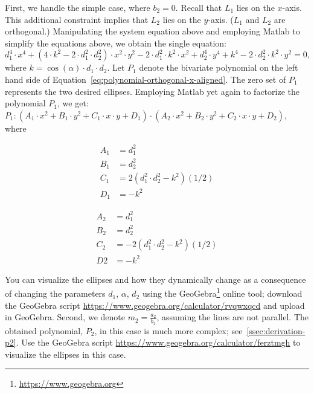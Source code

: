 First, we handle the simple case, where $b_2 = 0$. Recall that $L_1$ lies on the $x$-axis. This additional constraint implies that $L_2$ lies on the $y$-axis. ($L_1$ and $L_2$ are orthogonal.) Manipulating the system equation above and employing Matlab to simplify the equations above, we obtain the single equation:
\begin{equation}
  d_1^4\cdot x^4 + (4\cdot k^2 - 2\cdot d_1^2\cdot d_2^2)\cdot x^2\cdot y^2 - 2\cdot d_1^2\cdot k^2\cdot x^2 + d_2^4\cdot y^4 + k^4 - 2\cdot d_2^2\cdot k^2\cdot y^2 = 0\label{eq:polynomial-orthogonal-x-aligned},
\end{equation}
where $k = \cos(\alpha)\cdot d_1\cdot d_2$. Let $P_1$ denote the bivariate polynomial on the left hand side of Equation~\ref{eq:polynomial-orthogonal-x-aligned}. The zero set of $P_1$ represents the two desired ellipses. Employing Matlab yet again to factorize the polynomial $P_1$, we get: $P_1: (A_1\cdot x^2 + B_1\cdot y^2 + C_1\cdot x\cdot y + D_1)\cdot (A_2\cdot x^2 + B_2\cdot y^2 + C_2\cdot x\cdot y +D_2)$, where
\begin{minipage}[c]{0.5\linewidth}
\begin{align*}
  A_1 &= d_1^2\\
  B_1 &= d_2^2\\
  C_1 &= 2(d_1^2\cdot d_2^2 - k^2)(1/2)\\
  D_1 &= -k^2
\end{align*}
\end{minipage}
\begin{minipage}[c]{0.5\linewidth}
\begin{align*}
  A_2 &= d_1^2\\
  B_2 &= d_2^2\\
  C_2 &= -2(d_1^2\cdot d_2^2 - k^2)(1/2)\\
  D2 &= -k^2
\end{align*}
\end{minipage}
You can visualize the ellipses and how they dynamically change as a
consequence of changing the parameters $d_1$, $\alpha$, $d_2$ using
the GeoGebra\footnote{\url{https://www.geogebra.org}} online tool;
download the GeoGebra script
\url{https://www.geogebra.org/calculator/rvqwxqcd} and upload in
GeoGebra. Second, we denote $m_2 = \frac{a_2}{b_2}$, assuming the
lines are not parallel. The obtained polynomial, $P_2$, in this case
is much more complex; see~\ref{ssec:derivation-p2}. Use the GeoGebra
script \url{https://www.geogebra.org/calculator/ferztmgh} to visualize
the ellipses in this case.
